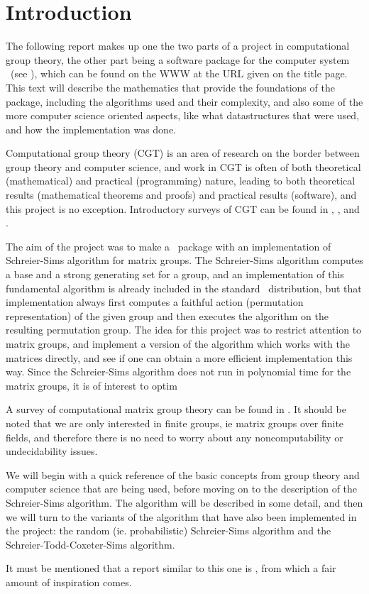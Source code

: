 \chapter{Introduction}
The following report makes up one the two parts of a project in
computational group theory, the other part being a software package
for the computer system \GAP~(see \cite{GAP}), which can be found on
the WWW at the URL given on the title page. This text will describe the mathematics that
provide the foundations of the package, including the algorithms used and their complexity,
and also some of the more computer science oriented aspects, like what
datastructures that were used, and how the implementation was done.

Computational group theory (CGT) is an area of research on the border
between group theory and computer science, and work in CGT
is often of both theoretical (mathematical) and practical
(programming) nature, leading to both theoretical results
(mathematical theorems and proofs) and practical results (software),
and this project is no exception. Introductory surveys of CGT can be
found in \cite{sims98}, \cite{seress97}, \cite{neubuser95} and \cite{cannon92}.

The aim of the project was to make a \GAP~package with an
implementation of Schreier-Sims algorithm for matrix groups. The Schreier-Sims algorithm computes a base and a strong generating set for a group, and an
implementation of this fundamental algorithm is already included in the
standard \GAP~distribution, but that implementation always first
computes a faithful action (permutation representation) of the given
group and then executes the algorithm on the resulting permutation
group. The idea for this project was to restrict attention to matrix
groups, and implement a version of the algorithm which works with the
matrices directly, and see if one can obtain a more efficient
implementation this way. Since the Schreier-Sims algorithm does not run in polynomial time for the matrix groups, it is of interest to optim

A survey of computational matrix group theory can be found in
\cite{niemeyer01}. It should be noted that we are only interested in
finite groups, ie matrix groups over finite fields, and therefore
there is no need to worry about any noncomputability or undecidability
issues.

We will begin with a quick reference of the basic concepts from group
theory and computer science that are being used, before moving on to the description of
the Schreier-Sims algorithm. The algorithm will be described in some
detail, and then we will turn to the variants of the algorithm that have also
been implemented in the project: the random (ie. probabilistic)
Schreier-Sims algorithm and the Schreier-Todd-Coxeter-Sims algorithm.

It must be mentioned that a report similar to this one is \cite{murray93}, from which a fair amount of inspiration comes.
